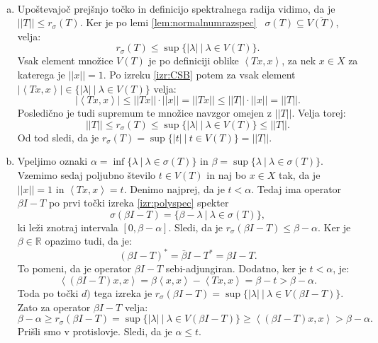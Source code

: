 \documentclass[12pt,a4paper,oneside,fleqn,openany]{book}
\newcommand{\eopf}{\raisebox{0.8ex}{\framebox{}}} %
\newenvironment{dokaz}%
{\noindent{\bf Dokaz.}\ }%
{\hfill\eopf\par\bigskip}%
\newcommand{\R}{\mathbb{R}}
\newcommand{\abs}[1]{\ensuremath{\lvert #1 \rvert}}
\newcommand{\norm}[1]{\abs{\abs{#1}}}
\newcommand{\Sp}[2]{\ensuremath{\left<#1, #2\right>}}
\begin{document}
\begin{dokaz}
\begin{enumerate}[a)]
		Prva točka izreka \ref{izr:polyspec} nam pove, da je $a^2\in \{\lambda^2~|~\lambda\in \sigma(T)\}$. Posledično je vsaj eno izmed števil $a=\norm{T}$ in $-a$ vsebovano v $\sigma(T)$.
		\item Upoštevajoč prejšnjo točko in definicijo spektralnega radija vidimo, da je $\norm{T}\leq r_\sigma(T)$. Ker je po lemi \ref{lem:normalnumrazspec} ~$\sigma(T) \subseteq \overline{V(T)}$, velja: $$r_\sigma(T) \leq \sup\{\abs{\lambda}~|~\lambda\in V(T)\}.$$ Vsak element množice $V(T)$ je po definiciji oblike $\Sp{Tx}{x}$, za nek $x\in X$ za katerega je $\norm{x}=1$. Po izreku \ref{izr:CSB} potem za vsak element $\abs{\Sp{Tx}{x}}\in \{\abs{\lambda}~|~\lambda\in V(T)\}$ velja: $$\abs{\Sp{Tx}{x}}\leq \norm{Tx}\cdot\norm{x} = \norm{Tx}\leq \norm{T}\cdot\norm{x}=\norm{T}.$$ Posledično je tudi supremum te množice navzgor omejen z $\norm{T}$. Velja torej: $$\norm{T} \leq r_\sigma(T) \leq \sup\{\abs{\lambda}~|~\lambda\in V(T)\} \leq \norm{T}.$$ Od tod sledi, da je $r_\sigma(T)=\sup\{\abs{t}~|~t\in V(T)\} = \norm{T}$.
		\item Vpeljimo oznaki $\alpha=\inf\{\lambda~|~\lambda\in\sigma(T)\}$ in $\beta=\sup\{\lambda~|~ \lambda\in\sigma(T)\}$. Vzemimo sedaj poljubno število $t\in V(T)$ in naj bo $x\in X$ tak, da je $\norm{x}=1$ in $\Sp{Tx}{x}=t$. 
		Denimo najprej, da je $t < \alpha$. Tedaj ima operator $\beta I - T$ po prvi točki izreka \ref{izr:polyspec} spekter $$\sigma(\beta I - T)=\{\beta - \lambda~|~\lambda\in\sigma(T)\},$$ ki leži znotraj intervala $[0, \beta - \alpha]$. Sledi, da je $r_\sigma(\beta I - T) \leq \beta - \alpha$. Ker je $\beta\in\R$ opazimo tudi, da je: $$(\beta I - T)^* = \bar{\beta}I - T^* = \beta I - T.$$ To pomeni, da je operator $\beta I - T$ sebi-adjungiran. Dodatno, ker je $t<\alpha$, je: $$\Sp{(\beta I - T)x}{x} = \beta\Sp{x}{x} - \Sp{Tx}{x} = \beta - t > \beta - \alpha.$$ Toda po točki $d)$ tega izreka je $r_\sigma(\beta I - T) = \sup\{\abs{\lambda}~|~\lambda\in V(\beta I - T)\}$. Zato za operator $\beta I - T$ velja: $$\beta - \alpha \geq r_\sigma(\beta I - T) = \sup\{\abs{\lambda}~|~\lambda\in V(\beta I - T)\}\geq\Sp{(\beta I - T)x}{x}>\beta - \alpha.$$ Prišli smo v protislovje. Sledi, da je $\alpha \leq t$.
		

\end{enumerate}
\end{dokaz}
\end{document}
